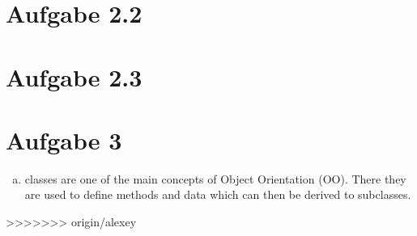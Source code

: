 \documentclass[a4paper,10pt]{scrartcl}[2003/01/01]
\begin{document}
	
	\section*{Aufgabe 2.2}
	
	\section*{Aufgabe 2.3}
	
	\section{Aufgabe 3}
	\begin{enumerate}[a)]
		\item classes are one of the main concepts of Object Orientation (OO). There they are used to define methods and data which can then be derived to subclasses.
		
	\end{enumerate}
	
>>>>>>> origin/alexey
\end{document}
